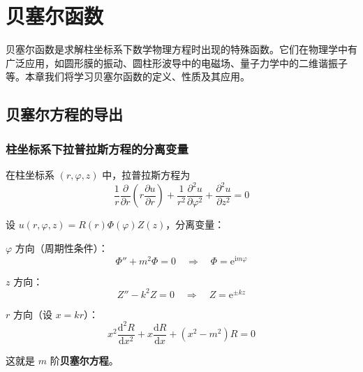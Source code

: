 
\chapter{贝塞尔函数}

\begin{wulibj}[本章导读]
贝塞尔函数是求解柱坐标系下数学物理方程时出现的特殊函数。它们在物理学中有广泛应用，如圆形膜的振动、圆柱形波导中的电磁场、量子力学中的二维谐振子等。本章我们将学习贝塞尔函数的定义、性质及其应用。
\end{wulibj}

\section{贝塞尔方程的导出}

\subsection{柱坐标系下拉普拉斯方程的分离变量}

在柱坐标系 $(r, \varphi, z)$ 中，拉普拉斯方程为
\begin{equation}
    \frac{1}{r}\frac{\partial}{\partial r}\left(r\frac{\partial u}{\partial r}\right) + \frac{1}{r^2}\frac{\partial^2 u}{\partial\varphi^2} + \frac{\partial^2 u}{\partial z^2} = 0
\end{equation}

设 $u(r, \varphi, z) = R(r)\Phi(\varphi)Z(z)$，分离变量：

$\varphi$ 方向（周期性条件）：
\begin{equation}
    \Phi'' + m^2\Phi = 0 \quad \Rightarrow \quad \Phi = \mathrm{e}^{\mathrm{i}m\varphi}
\end{equation}

$z$ 方向：
\begin{equation}
    Z'' - k^2 Z = 0 \quad \Rightarrow \quad Z = \mathrm{e}^{\pm kz}
\end{equation}

$r$ 方向（设 $x = kr$）：
\begin{equation}
    \boxed{x^2\frac{\mathrm{d}^2 R}{\mathrm{d}x^2} + x\frac{\mathrm{d}R}{\mathrm{d}x} + (x^2 - m^2)R = 0}
\end{equation}

这就是 $m$ 阶\textbf{贝塞尔方程}。

